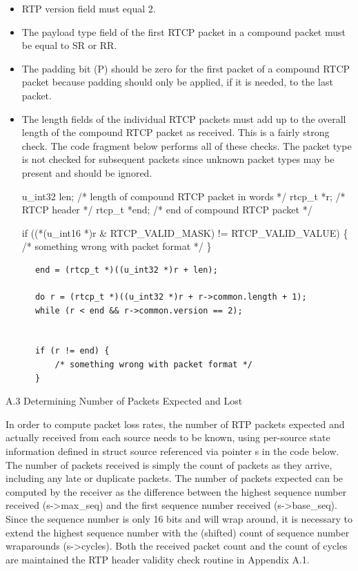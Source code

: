 \documentclass{article}
\begin{document}
\begin{itemize}
\item RTP version field must equal 2.
\item The payload type field of the first RTCP packet in a compound packet must be equal to SR or RR.
\item The padding bit (P) should be zero for the first packet of a compound RTCP packet because padding should only be applied, if it is needed, to the last packet.
\item The length fields of the individual RTCP packets must add up to the overall length of the compound RTCP packet as received.  This is a fairly strong check.
The code fragment below performs all of these checks.  The packet type is not checked for subsequent packets since unknown packet types may be present and should be ignored.

u\_int32 len;        /* length of compound RTCP packet in words */ rtcp\_t *r;          /* RTCP header */ rtcp\_t *end;        /* end of compound RTCP packet */

if ((*(u\_int16 *)r \& RTCP\_VALID\_MASK) != RTCP\_VALID\_VALUE) \{ /* something wrong with packet format */ \}

\end{itemize}
\begin{verbatim}
      end = (rtcp_t *)((u_int32 *)r + len);

      do r = (rtcp_t *)((u_int32 *)r + r->common.length + 1);
      while (r < end && r->common.version == 2);


      if (r != end) {
          /* something wrong with packet format */
      }
\end{verbatim}

A.3 Determining Number of Packets Expected and Lost

In order to compute packet loss rates, the number of RTP packets expected and actually received from each source needs to be known, using per-source state information defined in struct source referenced via pointer s in the code below.  The number of packets received is simply the count of packets as they arrive, including any late or duplicate packets.  The number of packets expected can be computed by the receiver as the difference between the highest sequence number received (s->max\_seq) and the first sequence number received (s->base\_seq).  Since the sequence number is only 16 bits and will wrap around, it is necessary to extend the highest sequence number with the (shifted) count of sequence number wraparounds (s->cycles).  Both the received packet count and the count of cycles are maintained the RTP header validity check routine in Appendix A.1.
\end{document}
